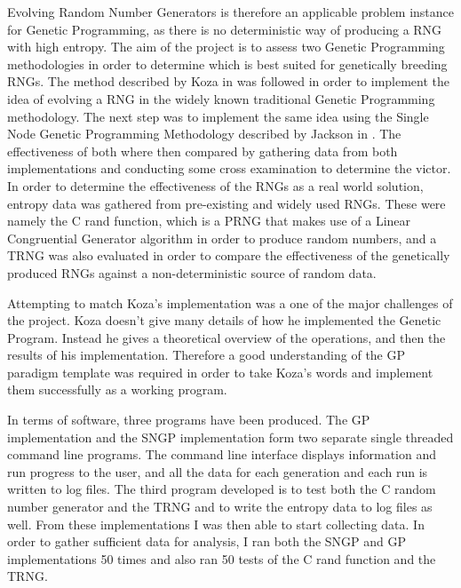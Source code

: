 \documentclass[a4paper,10.5pt]{article}
\begin{document}
Evolving Random Number Generators is therefore an applicable problem instance for Genetic Programming, as there is no deterministic way of producing a RNG with high entropy.  The aim of the project is to assess two Genetic Programming methodologies in order to determine which is best suited for genetically breeding RNGs. The method described by Koza in \cite{kozarng} was followed in order to implement the idea of evolving a RNG in the widely known traditional Genetic Programming methodology. The next step was to implement the same idea using the Single Node Genetic Programming Methodology described by Jackson in \cite{jacksonsngp}. The effectiveness of both where then compared by gathering data from both implementations and conducting some cross examination to determine the victor. In order to determine the effectiveness of the RNGs as a real world solution, entropy data was gathered from pre-existing and widely used RNGs. These were namely the C rand function, which is a PRNG that makes use of a Linear Congruential Generator algorithm in order to produce random numbers, and a TRNG was also evaluated in order to compare the effectiveness of the genetically produced RNGs against a non-deterministic source of random data. 

Attempting to match Koza's implementation was a one of the major challenges of the project. Koza doesn't give many details of how he implemented the Genetic Program. Instead he gives a theoretical overview of the operations, and then the results of his implementation. Therefore a good understanding of the GP paradigm template was required in order to take Koza's words and implement them successfully as a working program. 

In terms of software, three programs have been produced. The GP implementation and the SNGP implementation form two separate single threaded command line programs. The command line interface displays information and run progress to the user, and all the data for each generation and each run is written to log files. 
The third program developed is to test both the C random number generator and the TRNG and to write the entropy data to log files as well.
From these implementations I was then able to start collecting data. In order to gather sufficient data for analysis, I ran both the SNGP and GP implementations 50 times and also ran 50 tests of the C rand function and the TRNG. 
\end{document}
